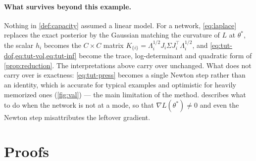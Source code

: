 \documentclass[10pt,twocolumn,letterpaper]{article}
\theoremstyle{definition}
\newcommand{\T}{^{\top}}
\begin{document}
\paragraph{What survives beyond this example.} Nothing in \cref{def:capacity} assumed a linear model. For a network, \cref{eq:laplace} replaces the exact posterior by the Gaussian matching the curvature of $L$ at $\theta^*$, the scalar $h_i$ becomes the $C\times C$ matrix $K_{\{i\}}=\Lambda_i^{1/2}J_i\Sigma J_i\T\Lambda_i^{1/2}$, and \cref{eq:tut-dof,eq:tut-vol,eq:tut-inf} become the trace, log-determinant and quadratic form of \cref{prop:reduction}. The interpretations above carry over unchanged. What does not carry over is exactness: \cref{eq:tut-press} becomes a single Newton step rather than an identity, which is accurate for typical examples and optimistic for heavily memorized ones (\cref{fig:val}) --- the main limitation of the method.  describes what to do when the network is not at a mode, so that $\nabla L(\theta^*)\ne0$ and even the Newton step misattributes the leftover gradient.

\section{Proofs}\label{app:proofs}
\end{document}
